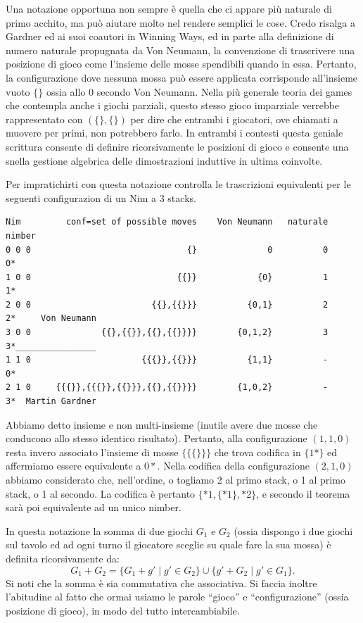 \documentclass[a4paper, 10pt]{report}
\theoremstyle{definition} %
\begin{document}
Una notazione opportuna non sempre è quella che ci appare più naturale di primo acchito,
ma può aiutare molto nel rendere semplici le cose.
Credo risalga a Gardner ed ai suoi coautori in Winning Ways,
ed in parte alla definizione di numero naturale propugnata da Von Neumann,
la convenzione di trascrivere una posizione di gioco come l'insieme delle mosse spendibili
quando in essa.
Pertanto, la configurazione dove nessuna mossa può essere applicata corrisponde all'insieme vuoto $\{\}$ ossia allo $0$ secondo Von Neumann.
Nella più generale teoria dei games che contempla anche i giochi parziali, questo stesso gioco imparziale
verrebbe rappresentato con $(\{\},\{\})$ per dire che entrambi i giocatori, ove chiamati a muovere per primi, non potrebbero farlo.
In entrambi i contesti questa geniale scrittura consente di definire ricorsivamente le posizioni di gioco e consente una snella gestione algebrica delle dimostrazioni induttive in ultima coinvolte.

Per impratichirti con questa notazione%
controlla le trascrizioni equivalenti per le seguenti configurazion di un Nim a $3$ stacks.

\begin{verbatim}
Nim         conf=set of possible moves    Von Neumann   naturale  nimber
0 0 0                               {}              0          0      0*
1 0 0                             {{}}            {0}          1      1*
2 0 0                        {{},{{}}}          {0,1}          2      2*     Von Neumann
3 0 0              {{},{{}},{{},{{}}}}        {0,1,2}          3      3*________________
1 1 0                      {{{}},{{}}}          {1,1}          -      0*     
2 1 0     {{{}},{{{}},{{}}},{{},{{}}}}        {1,0,2}          -      3*  Martin Gardner
\end{verbatim}

Abbiamo detto insieme e non multi-insieme (inutile avere due mosse che conducono allo stesso identico risultato).
Pertanto, alla configurazione $(1,1,0)$ resta invero associato l'insieme di mosse $\{\{\{\}\}\}$
che trova codifica in $\{1*\}$ ed affermiamo essere equivalente a $0*$.
Nella codifica della configurazione $(2,1,0)$ abbiamo considerato che,
nell'ordine, o togliamo 2 al primo stack, o 1 al primo stack, o 1 al secondo. 
La codifica è pertanto $\{*1,\{*1\},*2\}$, e secondo il teorema sarà poi equivalente ad un unico nimber.

In questa notazione la somma di due giochi $G_1$ e $G_2$ (ossia dispongo i due giochi sul tavolo ed ad ogni turno il giocatore sceglie su quale fare la sua mossa)
è definita ricorsivamente da:
\[
G_1 + G_2 = \{ G_1 + g' \mid g' \in G_2 \} \cup \{ g' + G_2 \mid g' \in G_1 \}.
\]
Si noti che la somma è sia commutativa che associativa.
Si faccia inoltre l'abitudine al fatto che ormai usiamo le parole ``gioco'' e ``configurazione'' (ossia posizione di gioco), in modo del tutto intercambiabile.
\end{document}
